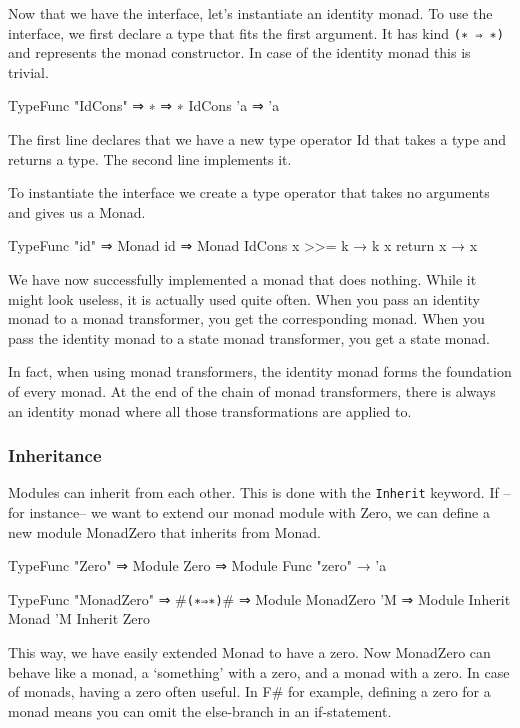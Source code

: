 Now that we have the interface, let's instantiate an identity monad.
To use the interface, we first declare a type that fits the first argument.
It has kind \verb|(∗ ⇒ ∗)| and represents the monad constructor.
In case of the identity monad this is trivial.

\begin{code}
  TypeFunc "IdCons" ⇒ ∗ ⇒ ∗
  IdCons 'a ⇒ 'a
\end{code}

The first line declares that we have a new type operator Id that takes a type and returns a type.
The second line implements it. 

To instantiate the interface we create a type operator that takes no arguments and gives us a Monad.

\begin{code}
  TypeFunc "id" ⇒ Monad 
  id ⇒ Monad IdCons {
    x >>= k → k x
    return x → x
  }
\end{code}

We have now successfully implemented a monad that does nothing.
While it might look useless, it is actually used quite often.
When you pass an identity monad to a monad transformer, you get the corresponding monad.
When you pass the identity monad to a state monad transformer, you get a state monad.

In fact, when using monad transformers, the identity monad forms the foundation of every monad.
At the end of the chain of monad transformers, there is always an identity monad where all those transformations are applied to.

\subsubsection*{Inheritance}
Modules can inherit from each other.
This is done with the \verb|Inherit| keyword. 
If --for instance-- we want to extend our monad module with Zero,
we can define a new module MonadZero that inherits from Monad.

\begin{code}
  TypeFunc "Zero" ⇒ Module
  Zero ⇒ Module {
    Func "zero" → 'a
  }

  TypeFunc "MonadZero" ⇒ #\verb|(∗⇒∗)|# ⇒ Module
  MonadZero 'M ⇒ Module {
    Inherit Monad 'M
    Inherit Zero
  }
\end{code}

This way, we have easily extended Monad to have a zero.
Now MonadZero can behave like a monad, a `something' with a zero, and a monad with a zero.
In case of monads, having a zero often useful.
In F\# for example, defining a zero for a monad means you can omit the else-branch in an if-statement.
